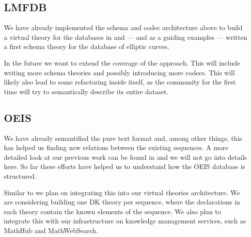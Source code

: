 \subsection{LMFDB}\label{sec:lmfdb}
We have already implemented the schema and codec architecture above to build a virtual
theory for the databases in \LMFDB and --- and as a guiding examples --- written a first schema theory for the database of elliptic curves.

In the future we want to extend the coverage of the approach. This will
include writing more schema theories and possibly introducing more codecs. This will
likely also lead to some refactoring inside \LMFDB itself, as the community for the first
time will try to semantically describe its entire dataset.

\subsection{OEIS}
We have already semantified the pure text format and, among other things, this has helped
us finding new relations between the existing sequences. A more detailed look at our
previous work can be found in \cite{LuzKoh:fsarfo16} and we will not go into details
here. So far these efforts have helped us to understand how the OEIS database is
structured.

Similar to \LMFDB we plan on integrating this into our virtual theories architecture. We
are considering building one DK theory per sequence, where the declarations in each theory
contain the known elements of the sequence. We also plan to integrate this with our
infrastructure on knowledge management services, such as MathHub and MathWebSearch.



